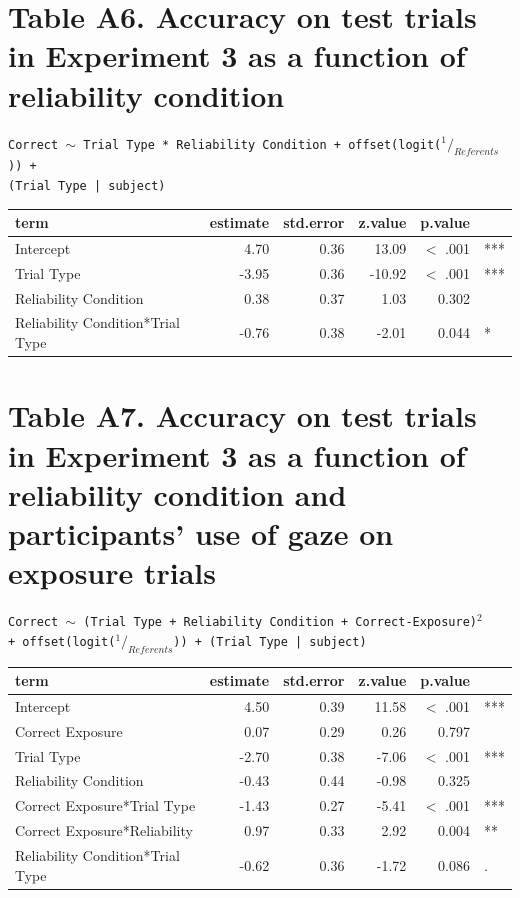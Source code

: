 \documentclass[authoryear, review]{elsarticle}
\begin{document}
\section*{Table A6. Accuracy on test trials in Experiment 3 as a function of reliability condition}

\texttt{Correct $\sim$ Trial Type * Reliability Condition + offset(logit($^1/_{Referents}$)) + \\ (Trial Type | subject)}

\begin{table}[h]
\centering
\begin{tabular}{lrrrrl}
 term & estimate & std.error & z.value & p.value &  \\ 
  \hline
Intercept & 4.70 & 0.36 & 13.09 & $<$ .001 & *** \\ 
  Trial Type & -3.95 & 0.36 & -10.92 & $<$ .001 & *** \\ 
  Reliability Condition & 0.38 & 0.37 & 1.03 & 0.302 &  \\ 
  Reliability Condition*Trial Type & -0.76 & 0.38 & -2.01 & 0.044 & * \\ 
   \hline
\end{tabular}
\label{tab:e3_acc_rel_cond}
\end{table}

\newpage

\section*{Table A7. Accuracy on test trials in Experiment 3 as a function of reliability condition and participants' use of gaze on exposure trials}

\texttt{Correct $\sim$ (Trial Type + Reliability Condition + Correct-Exposure)$^2$ \\ + offset(logit($^1/_{Referents}$)) + (Trial Type | subject)}

\begin{table}[h]
\centering
\begin{tabular}{lrrrrl}
 term & estimate & std.error & z.value & p.value &  \\ 
  \hline
Intercept & 4.50 & 0.39 & 11.58 & $<$ .001 & *** \\ 
  Correct Exposure & 0.07 & 0.29 & 0.26 & 0.797 &  \\ 
  Trial Type & -2.70 & 0.38 & -7.06 & $<$ .001 & *** \\ 
  Reliability Condition & -0.43 & 0.44 & -0.98 & 0.325 &  \\ 
  Correct Exposure*Trial Type & -1.43 & 0.27 & -5.41 & $<$ .001 & *** \\ 
  Correct Exposure*Reliability & 0.97 & 0.33 & 2.92 & 0.004 & ** \\ 
  Reliability Condition*Trial Type & -0.62 & 0.36 & -1.72 & 0.086 & . \\ 
   \hline
\end{tabular}
\label{tab:e3_acc_rel_cond_gf}
\end{table}
\end{document}
